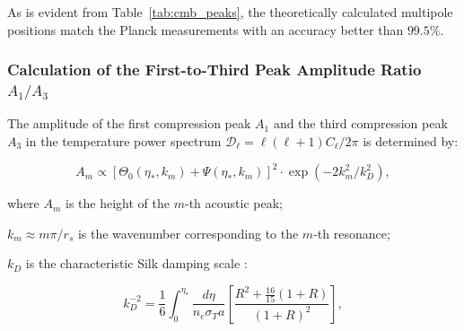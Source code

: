 \documentclass[11pt,a4paper]{article}
\theoremstyle{definition}
\begin{document}
\begin{table}[htbp]
\centering
\caption{Comparison of theoretical acoustic peak positions with Planck 2018 data.}\label{tab:cmb_peaks}
\end{table}

As is evident from Table~\ref{tab:cmb_peaks}, the theoretically calculated multipole positions match the Planck measurements with an accuracy better than $99.5\%$.


\subsubsection{Calculation of the First-to-Third Peak Amplitude Ratio $A_1 / A_3$}\label{sec:4.4.4}

The amplitude of the first compression peak $A_1$ and the third compression peak $A_3$ in the temperature power spectrum $\mathcal{D}_\ell = \ell(\ell+1)C_\ell / 2\pi$ is determined by:

\begin{equation}\label{eq:4.66}\tag{4.66}
A_m \propto \left[ \Theta_0(\eta_*, k_m) + \Psi(\eta_*, k_m) \right]^2 \cdot \exp\left( - 2 k_m^2 / k_D^2 \right),
\end{equation}

where $A_m$ is the height of the $m$-th acoustic peak;  

$k_m \approx m \pi / r_s$ is the wavenumber corresponding to the $m$-th resonance;  

$k_D$ is the characteristic Silk damping scale \cite{ref36}:

\begin{equation}\label{eq:4.67}\tag{4.67}
k_D^{-2} = \frac{1}{6} \int_0^{\eta_*} \frac{d\eta}{n_e \sigma_T a} \left[ \frac{R^2 + \frac{16}{15}(1+R)}{(1+R)^2} \right],
\end{equation}
\end{document}
